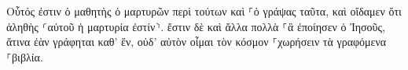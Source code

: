 \documentclass{openreader}
\begin{document}
Οὗτός ἐστιν ὁ μαθητὴς ὁ μαρτυρῶν περὶ τούτων καὶ ⸀ὁ γράψας ταῦτα, καὶ οἴδαμεν ὅτι ἀληθὴς ⸂αὐτοῦ ἡ μαρτυρία ἐστίν⸃. 
ἔστιν δὲ καὶ ἄλλα πολλὰ ⸀ἃ ἐποίησεν ὁ Ἰησοῦς, ἅτινα ἐὰν γράφηται καθ’ ἕν, οὐδ’ αὐτὸν οἶμαι τὸν κόσμον ⸀χωρήσειν τὰ γραφόμενα ⸀βιβλία. 
\end{document}
